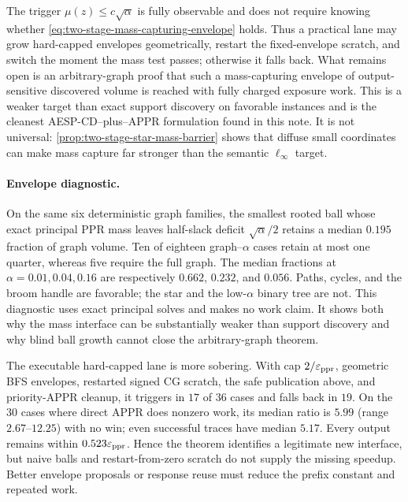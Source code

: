 The trigger $\mu(z)\leq c\sqrt\alpha$ is fully observable and does not
require knowing whether \cref{eq:two-stage-mass-capturing-envelope} holds.
Thus a practical lane may grow hard-capped envelopes geometrically, restart
the fixed-envelope scratch, and switch the moment the mass test passes;
otherwise it falls back.  What remains open is an arbitrary-graph proof that
such a mass-capturing envelope of output-sensitive discovered volume is
reached with fully charged exposure work.  This is a weaker target than exact
support discovery on favorable instances and is the cleanest
AESP-CD--plus--APPR formulation found in this note.  It is not universal:
\cref{prop:two-stage-star-mass-barrier} shows that diffuse small coordinates
can make mass capture far stronger than the semantic $\ell_\infty$ target.

\paragraph{Envelope diagnostic.}
On the same six deterministic graph families, the smallest rooted ball whose
exact principal PPR mass leaves half-slack deficit
$\sqrt\alpha/2$ retains a median $0.195$ fraction of graph volume.  Ten of
eighteen graph--$\alpha$ cases retain at most one quarter, whereas five
require the full graph.  The median fractions at
$\alpha=0.01,0.04,0.16$ are respectively $0.662$, $0.232$, and $0.056$.
Paths, cycles, and the broom handle are favorable; the star and the
low-$\alpha$ binary tree are not.  This diagnostic uses exact principal
solves and makes no work claim.  It shows both why the mass interface can be
substantially weaker than support discovery and why blind ball growth cannot
close the arbitrary-graph theorem.

The executable hard-capped lane is more sobering.  With cap
$2/\varepsilon_{\mathrm{ppr}}$, geometric BFS envelopes, restarted signed CG scratch, the safe
publication above, and priority-APPR cleanup, it triggers in $17$ of $36$
cases and falls back in $19$.  On the $30$ cases where direct APPR does
nonzero work, its median ratio is $5.99$ (range $2.67$--$12.25$) with no
win; even successful traces have median $5.17$.  Every output remains within
$0.523\varepsilon_{\mathrm{ppr}}$.  Hence the theorem identifies a legitimate new interface,
but naive balls and restart-from-zero scratch do not supply the missing
speedup.  Better envelope proposals or response reuse must reduce the prefix
constant and repeated work.

